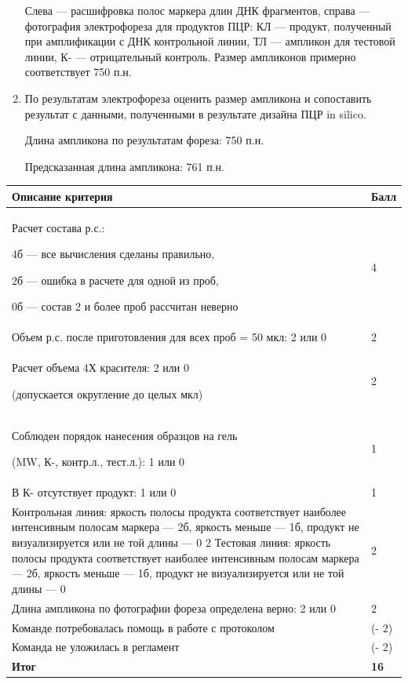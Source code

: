 \begin{enumerate}
    Слева — расшифровка полос маркера длин ДНК фрагментов, справа — фотография электрофореза для продуктов ПЦР: КЛ — продукт, полученный при амплификации с ДНК контрольной линии, ТЛ — ампликон для тестовой линии, К- — отрицательный контроль. Размер ампликонов примерно соответствует 750 п.н.

    \item По результатам электрофореза оценить размер ампликона и сопоставить результат с данными, полученными в результате дизайна ПЦР in silico.

    Длина ампликона по результатам фореза: 750 п.н.

    Предсказанная длина ампликона: 761 п.н.

\end{enumerate}

\markSection

\begin{tabular}{|p{11cm}|p{3cm}|}
    \hline
    \textbf{Описание критерия} & \textbf{Балл} \\
    \hline
    Расчет состава р.с.: 

    4б — все вычисления сделаны правильно, 

    2б — ошибка в расчете для одной из проб, 

    0б — состав 2 и более проб рассчитан неверно & 4 \\
    \hline
    Объем р.с. после приготовления для всех проб = 50 мкл: 2 или 0 & 2 \\
    \hline
    Расчет объема 4Х красителя: 2 или 0

    (допускается округление до целых мкл) & 2 \\
    \hline
    Соблюден порядок нанесения образцов на гель 

    (MW, К-, контр.л., тест.л.): 1 или 0 & 1 \\
    \hline
    В К- отсутствует продукт: 1 или 0 & 1 \\
    Контрольная линия: 
    яркость полосы продукта соответствует наиболее интенсивным полосам маркера — 2б, 
    яркость меньше — 1б, 
    продукт не визуализируется или не той длины — 0	2
    Тестовая линия: яркость полосы продукта соответствует наиболее интенсивным полосам маркера — 2б, 
    яркость меньше — 1б, 
    продукт не визуализируется или не той длины — 0 & 2 \\
    \hline
    Длина ампликона по фотографии фореза определена верно: 2 или 0 & 2 \\
    \hline
    Команде потребовалась помощь в работе с протоколом & (- 2) \\
    \hline
    Команда не уложилась в регламент & (- 2) \\
    \hline
    \hline
    \textbf{Итог} & \textbf{16} \\
    \hline 
\end{tabular}